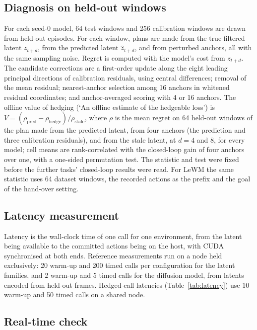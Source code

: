 \documentclass[aps,physrev,\manuscriptlayout,superscriptaddress,
  longbibliography,amsmath,amssymb]{revtex4-2}
\begin{document}
\subsection{Diagnosis on held-out windows}\label{app:diagnosis}

For each seed-0 model, 64 test windows and 256 calibration windows are drawn from held-out episodes. For each window, plans are made from the true filtered latent $z_{t+d}$, from the predicted latent $\hat z_{t+d}$, and from perturbed anchors, all with the same sampling noise. Regret is computed with the model's cost from $z_{t+d}$. The candidate corrections are a first-order update along the eight leading principal directions of calibration residuals, using central differences; removal of the mean residual; nearest-anchor selection among 16 anchors in whitened residual coordinates; and anchor-averaged scoring with 4 or 16 anchors. The offline value of hedging (`An offline estimate of the hedgeable loss') is $V=(\rho_{\mathrm{pred}}-\rho_{\mathrm{hedge}})/\rho_{\mathrm{stale}}$, where $\rho$ is the mean regret on 64 held-out windows of the plan made from the predicted latent, from four anchors (the prediction and three calibration residuals), and from the stale latent, at $d=4$ and $8$, for every model; cell means are rank-correlated with the closed-loop gain of four anchors over one, with a one-sided permutation test. The statistic and test were fixed before the further tasks' closed-loop results were read. For LeWM the same statistic uses 64 dataset windows, the recorded actions as the prefix and the goal of the hand-over setting.

\subsection{Latency measurement}\label{app:latency}

Latency is the wall-clock time of one call for one environment, from the latent being available to the committed actions being on the host, with CUDA synchronised at both ends. Reference measurements run on a node held exclusively: 20 warm-up and 200 timed calls per configuration for the latent families, and 2 warm-up and 5 timed calls for the diffusion model, from latents encoded from held-out frames. Hedged-call latencies (Table~\ref{tab:latency}) use 10 warm-up and 50 timed calls on a shared node.

\subsection{Real-time check}\label{app:realtime}
\end{document}

